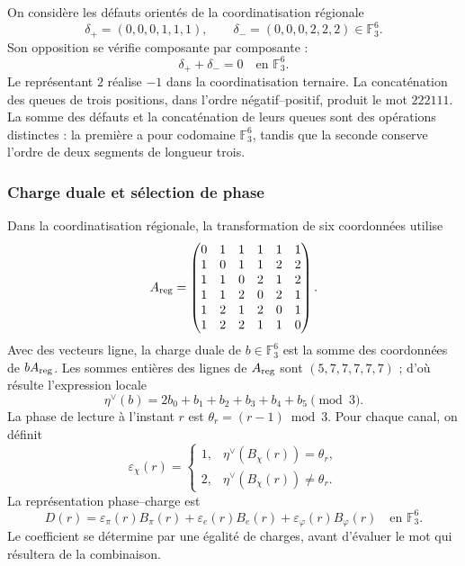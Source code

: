 On considère les défauts orientés de la coordinatisation régionale
\[
 \delta_+=(0,0,0,1,1,1),\qquad
 \delta_-=(0,0,0,2,2,2)\in\mathbb F_3^6.
\]
Son opposition se vérifie composante par composante :
\[
 \delta_++\delta_-=0\quad\text{en }\mathbb F_3^6.
\]
Le représentant $2$ réalise $-1$ dans la coordinatisation ternaire. La concaténation
des queues de trois positions, dans l'ordre négatif--positif, produit
le mot $222111$. La somme des défauts et la concaténation de leurs
queues sont des opérations distinctes : la première a pour codomaine
$\mathbb F_3^6$, tandis que la seconde conserve l'ordre de deux
segments de longueur trois.

\subsubsection{Charge duale et sélection de phase}

Dans la coordinatisation régionale, la transformation de six coordonnées utilise
\[
 A_{\rm reg}=
 \begin{pmatrix}
 0&1&1&1&1&1\\
 1&0&1&1&2&2\\
 1&1&0&2&1&2\\
 1&1&2&0&2&1\\
 1&2&1&2&0&1\\
 1&2&2&1&1&0
 \end{pmatrix}.
\]
Avec des vecteurs ligne, la charge duale de $b\in\mathbb F_3^6$ est la somme
des coordonnées de $bA_{\rm reg}$. Les sommes entières des lignes de
$A_{\rm reg}$ sont $(5,7,7,7,7,7)$ ; d'où résulte l'expression locale
\begin{equation}
 \eta^\vee(b)=2b_0+b_1+b_2+b_3+b_4+b_5\pmod3.
 \label{act21:eq:kdes-cargadual}
\end{equation}
La phase de lecture à l'instant $r$ est
$\theta_r=(r-1)\bmod3$. Pour chaque canal, on définit
\[
 \varepsilon_\chi(r)=
 \begin{cases}
 1,&\eta^\vee(B_\chi(r))=\theta_r,\\
 2,&\eta^\vee(B_\chi(r))\ne\theta_r.
 \end{cases}
\]
La représentation phase--charge est
\begin{equation}
 D(r)=\varepsilon_\pi(r)B_\pi(r)
      +\varepsilon_e(r)B_e(r)
      +\varepsilon_\varphi(r)B_\varphi(r)
      \quad\text{en }\mathbb F_3^6.
 \label{act21:eq:kdes-fasecarga}
\end{equation}
Le coefficient se détermine par une égalité de charges, avant d'évaluer le mot qui résultera de la combinaison.

